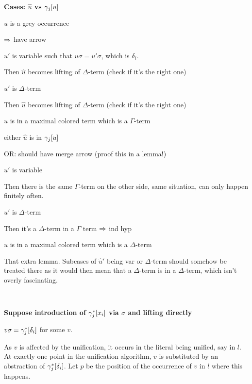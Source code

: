 \documentclass[,%
	paper=a4,%
	DIV12, %
	twoside=false,%
	liststotoc,
	bibtotoc,
	draft=false,%
	numbers=noendperiod
]{scrartcl}
\begin{document}
\textbf{Cases: $\hat u$ vs $\gamma_j[u]$}
\begin{compactitem}
\item $\hat u$ is a grey occurrence 

	$\Rightarrow$ have arrow

	\begin{compactitem}
	\item $\hat u'$ is variable such that $u\sigma = u'\sigma$, which is $\delta_i$.

		Then $\hat u$ becomes lifting of $\Delta$-term (check if it's the right one)
	\item $\hat u'$ is $\Delta$-term

		Then $\hat u$ becomes lifting of $\Delta$-term (check if it's the right one)
	\end{compactitem}

\item $\hat u$ is in a maximal colored term which is a $\Gamma$-term

	either $\hat u$ is in $\gamma_j[u]$ \checkmark

	OR: should have merge arrow (proof this in a lemma!)

	\begin{compactitem}
	\item $\hat u'$ is variable 

		Then there is the same $\Gamma$-term on the other side, same situation, can only happen finitely often.

	\item $\hat u'$ is $\Delta$-term

		Then it's a $\Delta$-term in a $\Gamma$ term $\Rightarrow$ ind hyp
	\end{compactitem}
\item $\hat u$ is in a maximal colored term which is a $\Delta$-term

	That extra lemma. Subcases of $\hat u'$ being var or $\Delta$-term should somehow be treated there as it would then mean that a $\Delta$-term is in a $\Delta$-term, which isn't overly fascinating.
\end{compactitem}


~

{\bfseries Suppose introduction of $\gamma_j^*[x_i]$ via $\sigma$ and lifting directly}

$v\sigma = \gamma_j^*[\delta_i]$ for some $v$.

As $v$ is affected by the unification, it occurs in the literal being unified, say in $l$.
At exactly one point in the unification algorithm, $v$ is substituted by an abstraction of $\gamma_j^*[\delta_i]$.
Let $p$ be the position of the occurrence of $v$ in $l$ where this happens.
\end{document}
